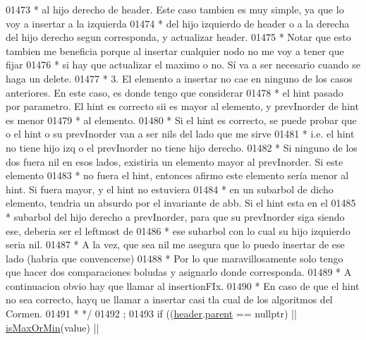 \begin{DoxyCode}
01473 \textcolor{comment}{         * al hijo derecho de header. Este caso tambien es muy simple, ya que lo voy a insertar a la
       izquierda}
01474 \textcolor{comment}{         * del hijo izquierdo de header o a la derecha del hijo derecho segun corresponda, y actualizar
       header.}
01475 \textcolor{comment}{         * Notar que esto tambien me beneficia porque al insertar cualquier nodo no me voy a tener que
       fijar}
01476 \textcolor{comment}{         * si hay que actualizar el maximo o no. Sí va a ser necesario cuando se haga un delete.}
01477 \textcolor{comment}{         * 3. El elemento a insertar no cae en ninguno de los casos anteriores. En este caso, es donde
       tengo que considerar}
01478 \textcolor{comment}{         * el hint pasado por parametro. El hint es correcto sii es mayor al elemento, y prevInorder de
       hint es menor}
01479 \textcolor{comment}{         * al elemento.}
01480 \textcolor{comment}{         * Si el hint es correcto, se puede probar que o el hint o su prevInorder van a ser nils del lado
       que me sirve}
01481 \textcolor{comment}{         * i.e. el hint no tiene hijo izq o el prevInorder no tiene hijo derecho.}
01482 \textcolor{comment}{         * Si ninguno de los dos fuera nil en esos lados, existiria un elemento mayor al prevInorder. Si
       este elemento}
01483 \textcolor{comment}{         * no fuera el hint, entonces afirmo este elemento sería menor al hint. Si fuera mayor, y el hint
       no estuviera}
01484 \textcolor{comment}{         * en un subarbol de dicho elemento, tendria un absurdo por el invariante de abb. Si el hint esta
       en el}
01485 \textcolor{comment}{         * subarbol del hijo derecho a prevInorder, para que su prevInorder siga siendo ese, deberia ser el
       leftmost de}
01486 \textcolor{comment}{         * ese subarbol con lo cual su hijo izquierdo seria nil.}
01487 \textcolor{comment}{         * A la vez, que sea nil me asegura que lo puedo insertar de ese lado (habria que convencerse)}
01488 \textcolor{comment}{         * Por lo que maravillosamente solo tengo que hacer dos comparaciones boludas y asignarlo donde
       corresponda.}
01489 \textcolor{comment}{         * A continuacion obvio hay que llamar al insertionFIx.}
01490 \textcolor{comment}{         * En caso de que el hint no sea correcto, hayq ue llamar a insertar casi tla cual de los
       algoritmos del Cormen.}
01491 \textcolor{comment}{         * */}
01492        ;
01493         \textcolor{keywordflow}{if} ((\hyperlink{classaed2_1_1map_a92d93f905c8ad73fba18fdc7e8915cce_a92d93f905c8ad73fba18fdc7e8915cce}{header}.\hyperlink{structaed2_1_1map_1_1Node_ab6a5f9e471b311755e4a56834086cb90_ab6a5f9e471b311755e4a56834086cb90}{parent} == \textcolor{keyword}{nullptr}) || \hyperlink{classaed2_1_1map_a81db4ead6daafe94938d5410173bdb6c_a81db4ead6daafe94938d5410173bdb6c}{isMaxOrMin}(value) || 

\end{DoxyCode}
